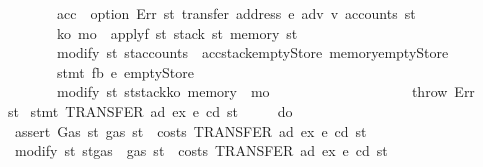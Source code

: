 \begin{isabellebody}
\ \ \ \ \ \ \ \ \ \ \ \ acc\ {\isasymleftarrow}\ option\ Err\ {\isacharparenleft}{\kern0pt}{\isasymlambda}st{\isachardot}{\kern0pt}\ transfer\ {\isacharparenleft}{\kern0pt}address\ e{\isacharparenright}{\kern0pt}\ adv\ v{\isacharprime}{\kern0pt}\ {\isacharparenleft}{\kern0pt}accounts\ st{\isacharparenright}{\kern0pt}{\isacharparenright}{\kern0pt}{\isacharsemicolon}{\kern0pt}\isanewline
\ \ \ \ \ \ \ \ \ \ \ \ {\isacharparenleft}{\kern0pt}k\isactrlsub o{\isacharcomma}{\kern0pt}\ m\isactrlsub o{\isacharparenright}{\kern0pt}\ {\isasymleftarrow}\ applyf\ {\isacharparenleft}{\kern0pt}{\isasymlambda}st{\isachardot}{\kern0pt}\ {\isacharparenleft}{\kern0pt}stack\ st{\isacharcomma}{\kern0pt}\ memory\ st{\isacharparenright}{\kern0pt}{\isacharparenright}{\kern0pt}{\isacharsemicolon}{\kern0pt}\isanewline
\ \ \ \ \ \ \ \ \ \ \ \ modify\ {\isacharparenleft}{\kern0pt}{\isasymlambda}st{\isachardot}{\kern0pt}\ st{\isasymlparr}accounts\ {\isacharcolon}{\kern0pt}{\isacharequal}{\kern0pt}\ acc{\isacharcomma}{\kern0pt}stack{\isacharcolon}{\kern0pt}{\isacharequal}{\kern0pt}emptyStore{\isacharcomma}{\kern0pt}\ memory{\isacharcolon}{\kern0pt}{\isacharequal}{\kern0pt}emptyStore{\isasymrparr}{\isacharparenright}{\kern0pt}{\isacharsemicolon}{\kern0pt}\isanewline
\ \ \ \ \ \ \ \ \ \ \ \ stmt\ fb\ e{\isacharprime}{\kern0pt}\ emptyStore{\isacharsemicolon}{\kern0pt}\isanewline
\ \ \ \ \ \ \ \ \ \ \ \ modify\ {\isacharparenleft}{\kern0pt}{\isasymlambda}st{\isachardot}{\kern0pt}\ st{\isasymlparr}stack{\isacharcolon}{\kern0pt}{\isacharequal}{\kern0pt}k\isactrlsub o{\isacharcomma}{\kern0pt}\ memory\ {\isacharcolon}{\kern0pt}{\isacharequal}{\kern0pt}\ m\isactrlsub o{\isasymrparr}{\isacharparenright}{\kern0pt}\isanewline
\ \ \ \ \ \ \ \ \ \ {\isacharbraceright}{\kern0pt}\isanewline
\ \ \ \ \ \ {\isacharbar}{\kern0pt}\ {\isacharunderscore}{\kern0pt}\ {\isasymRightarrow}\ throw\ Err\isanewline
\ \ \ \ {\isacharbraceright}{\kern0pt}{\isacharparenright}{\kern0pt}\ st{\isachardoublequoteclose}\isanewline
{\isacharbar}{\kern0pt}\ {\isachardoublequoteopen}stmt\ {\isacharparenleft}{\kern0pt}TRANSFER\ ad\ ex{\isacharparenright}{\kern0pt}\ e\ cd\ st\ {\isacharequal}{\kern0pt}\isanewline
\ \ \ \ {\isacharparenleft}{\kern0pt}do\ {\isacharbraceleft}{\kern0pt}\isanewline
\ \ \ \ \ \ assert\ Gas\ {\isacharparenleft}{\kern0pt}{\isasymlambda}st{\isachardot}{\kern0pt}\ gas\ st\ {\isachargreater}{\kern0pt}\ costs\ {\isacharparenleft}{\kern0pt}TRANSFER\ ad\ ex{\isacharparenright}{\kern0pt}\ e\ cd\ st{\isacharparenright}{\kern0pt}{\isacharsemicolon}{\kern0pt}\isanewline
\ \ \ \ \ \ modify\ {\isacharparenleft}{\kern0pt}{\isasymlambda}st{\isachardot}{\kern0pt}\ st{\isasymlparr}gas\ {\isacharcolon}{\kern0pt}{\isacharequal}{\kern0pt}\ gas\ st\ {\isacharminus}{\kern0pt}\ costs\ {\isacharparenleft}{\kern0pt}TRANSFER\ ad\ ex{\isacharparenright}{\kern0pt}\ e\ cd\ st{\isasymrparr}{\isacharparenright}{\kern0pt}{\isacharsemicolon}{\kern0pt}\isanewline

\end{isabellebody}
